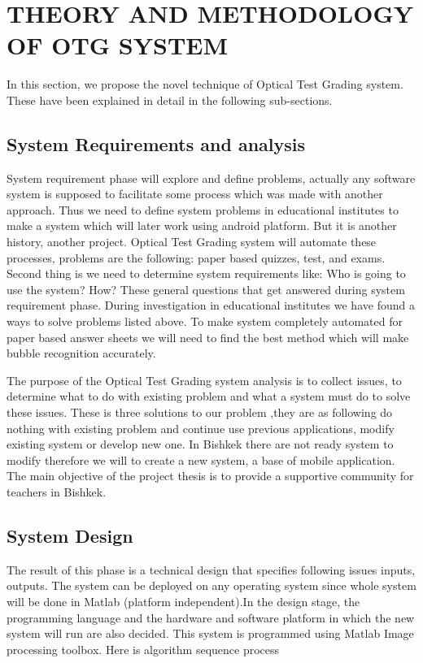 \documentclass[a4paper,10pt]{article}
\begin{document}
\section{THEORY AND METHODOLOGY OF OTG SYSTEM}
In this section, we propose the novel technique of Optical Test Grading system. These have been explained in detail in the following sub-sections.
\subsection{System Requirements and analysis}
System requirement phase will explore and define problems, actually any software system is supposed to facilitate some process which was made with another approach. Thus we need to define system problems in educational institutes to make a system which will later work using android platform. But it is another history, another project. Optical Test Grading system will automate these processes, problems are the following: paper based quizzes, test, and exams. Second thing is we need to determine system requirements like: Who is going to use the system? How? These general questions that get answered during system requirement phase. During investigation in educational institutes we have found a ways to solve problems listed above. To make system completely automated for paper based answer sheets we will need to find the best method which will make bubble recognition accurately.

The purpose of the Optical Test Grading system analysis is to collect issues, to determine what to do with existing problem and what a system must do to solve these issues. These is three solutions to our problem ,they are as following do nothing with existing problem and continue use previous applications, modify existing system or develop new one. In Bishkek there are not ready system to modify therefore we will to create a new system, a base of mobile application. The main objective of the project thesis is to provide a supportive community for teachers in Bishkek. 
\subsection{System Design}
The result of this phase is a technical design that specifies following issues inputs, outputs. The system can be deployed on any operating system since whole system will be done in Matlab (platform independent).In the design stage, the programming language and the hardware and software platform in which the new system will run are also decided. This system is programmed using Matlab Image processing toolbox. Here is algorithm sequence process 
\end{document}
